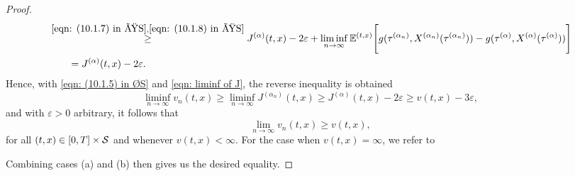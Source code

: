 \begin{proof}
\begin{align}
        & \overset{\eqref{eqn: (10.1.7) in ØS}, \eqref{eqn: (10.1.8) in ØS}}{\geq} J^{(\alpha)}(t,x) - 2 \varepsilon + \liminf_{n \rightarrow \infty} \mathbb{E}^{(t,x)}\Bigg[g(\tau^{(\alpha_n)},X^{(\alpha_n)}(\tau^{(\alpha_n)})) - g(\tau^{(\alpha)},X^{(\alpha)}(\tau^{(\alpha)}))\Bigg] \nonumber \\
        & \qquad = J^{(\alpha)}(t,x) - 2\varepsilon.
    \label{eqn: liminf of J}
    \end{align}
    Hence, with \eqref{eqn: (10.1.5) in ØS} and \eqref{eqn: liminf of J}, the reverse inequality is obtained
    \begin{equation*}
        \liminf_{n \rightarrow \infty} v_n(t,x) \geq \liminf_{n \rightarrow \infty} J^{(\alpha_n)}(t,x) \geq J^{(\alpha)}(t,x) - 2\varepsilon \geq v(t,x) - 3\varepsilon,
    \end{equation*}
    and with $\varepsilon > 0$ arbitrary, it follows that 
    \begin{equation*}
        \lim_{n \rightarrow \infty} v_n(t,x) \geq v(t,x),
    \end{equation*}
    for all $(t,x) \in [0,T] \times \mathcal{S}$ and whenever $v(t,x) < \infty$. For the case when $v(t,x) = \infty$, we refer to \cite[p.257]{oksendal2007applied}
    
    Combining cases (a) and (b) then gives us the desired equality.
\end{proof}

